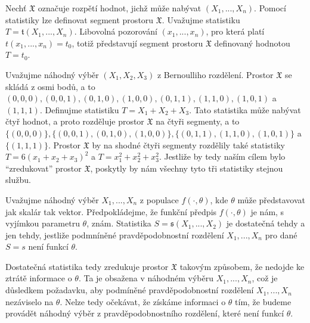 Nechť $\mathfrak{X}$ označuje rozpětí hodnot, jichž může nabývat $(X_1, ..., X_n)$. Pomocí statistiky lze definovat segment prostoru $\mathfrak{X}$. Uvažujme statistiku $T = \mathfrak{t}(X_1, ..., X_n)$. Libovolná pozorování $(x_1, ..., x_n)$, pro která platí $t(x_1, ..., x_n) = t_0$, totiž představují segment prostoru $\mathfrak{X}$ definovaný hodnotou $T = t_0$.

\begin{example}
Uvažujme náhodný výběr $(X_1, X_2, X_3)$ z Bernoulliho rozdělení. Prostor $\mathfrak{X}$ se skládá z osmi bodů, a to $(0,0,0), (0,0,1), (0,1,0), (1,0,0), (0,1,1), (1,1,0), (1,0,1)$ a $(1,1,1)$. Definujme statistiku $T = X_1 + X_2 + X_3$. Tato statistika může nabývat čtyř hodnot, a proto rozděluje prostor $\mathfrak{X}$ na čtyři segmenty, a to  $\{(0,0,0)\}, \{(0,0,1), (0,1,0), (1,0,0) \}, \{(0,1,1), (1,1,0), (1,0,1)\}$ a $\{(1,1,1)\}$. Prostor $\mathfrak{X}$ by na shodné čtyři segmenty rozdělily také statistiky $T = 6(x_1 + x_2 + x_3)^2$ a $T = x_1^2 + x_2^2 + x_3^2$. Jestliže by tedy naším cílem bylo ``zredukovat'' prostor $\mathfrak{X}$, poskytly by nám všechny tyto tři statistiky stejnou službu.
\end{example}

\begin{definition}
Uvažujme náhodný výběr $X_1, ..., X_n$ z populace $f(\cdot, \theta)$, kde $\theta$ může představovat jak skalár tak vektor. Předpokládejme, že funkční předpis $f(\cdot, \theta)$ je nám, s vyjímkou parametru $\theta$, znám. Statistika $S = \mathfrak{s}(X_1, ..., X_2)$ je dostatečná tehdy a jen tehdy, jestliže podmníněné pravděpodobnostní rozdělení $X_1, ..., X_n$ pro dané $S = s$ není funkcí $\theta$.
\end{definition}

Dostatečná statistika tedy zredukuje prostor $\mathfrak{X}$ takovým způsobem, že nedojde ke ztrátě informace o $\theta$. Ta je obsažena v náhodném výběru $X_1, ..., X_n$, což je důsledkem požadavku, aby podmíněné pravděpodobnostní rozdělení $X_1, ..., X_n$ nezáviselo na $\theta$. Nelze tedy očekávat, že získáme informaci o $\theta$ tím, že budeme provádět náhodný výběr z pravděpodobnostního rozdělení, které není funkcí $\theta$.

